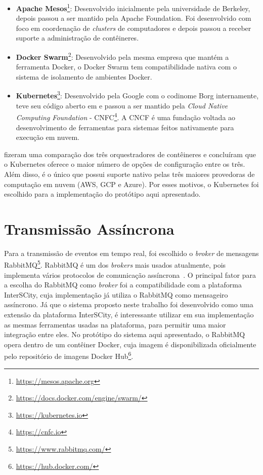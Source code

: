 \begin{itemize}
    \item \textbf{Apache Mesos}\footnote{\url{https://mesos.apache.org}}: Desenvolvido inicialmente pela universidade de Berkeley, depois passou a ser mantido pela Apache Foundation. Foi desenvolvido com foco em coordenação de \textit{clusters} de computadores e depois passou a receber suporte a administração de contêineres. %
    \item \textbf{Docker Swarm}\footnote{\url{https://docs.docker.com/engine/swarm/}}: Desenvolvido pela mesma empresa que mantém a ferramenta Docker, o Docker Swarm tem compatibilidade nativa com o sistema de isolamento de ambientes Docker.
    \item \textbf{Kubernetes}\footnote{\url{https://kubernetes.io}}: Desenvolvido pela Google com o codinome Borg internamente, teve seu código aberto em e passou a ser mantido pela \textit{Cloud Native Computing Foundation} - CNFC\footnote{\url{https://cnfc.io}}. A CNCF é uma fundação voltada ao desenvolvimento de ferramentas para sistemas feitos nativamente para execução em nuvem.
\end{itemize}  
    
\cite{Truyen_2019} fizeram uma comparação dos três orquestradores de contêineres e concluíram que o Kubernetes oferece o maior número de opções de configuração entre os três. Além disso, é o único que possui suporte nativo pelas três maiores provedoras de computação em nuvem (AWS, GCP e Azure). Por esses motivos, o Kubernetes foi escolhido para a implementação do protótipo aqui apresentado.


\section{Transmissão Assíncrona}

Para a transmissão de eventos em tempo real, foi escolhido o \textit{broker} de mensagens RabbitMQ\footnote{\url{https://www.rabbitmq.com/}}. RabbitMQ é um dos \textit{brokers} mais usados atualmente, pois implementa vários protocolos de comunicação assíncrona~\citep{Dobbelaere:2017:KVR:3093742.3093908}. O principal fator para a escolha do RabbitMQ como \textit{broker} foi a compatibilidade com a plataforma InterSCity, cuja implementação já utiliza o RabbitMQ como mensageiro assíncrono. Já que o sistema proposto neste trabalho foi desenvolvido como uma extensão da plataforma InterSCity, é interessante utilizar em sua implementação as mesmas ferramentas usadas na plataforma, para permitir uma maior integração entre eles.
No protótipo do sistema aqui apresentado, o RabbitMQ opera dentro de um contêiner Docker, cuja imagem é disponibilizada oficialmente pelo repositório de imagens Docker Hub\footnote{\url{https://hub.docker.com/}}. 



